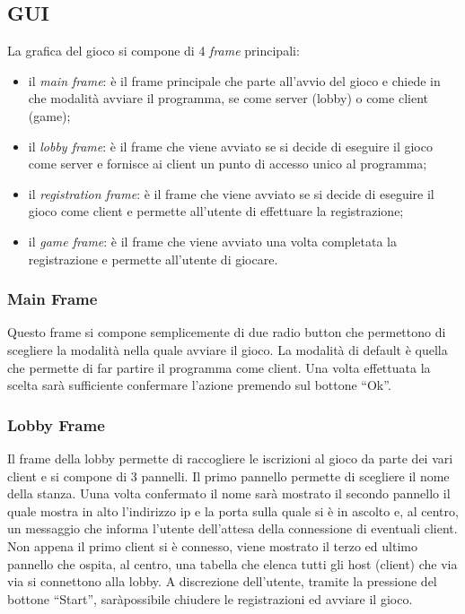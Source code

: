 \subsection{GUI}
La grafica del gioco si compone di 4 \textit{frame} principali:
\begin{itemize}
	\item il \textit{main frame}: è il frame principale che parte all'avvio del
	gioco e chiede in che modalità avviare il programma, se come server (lobby)
	o come client (game);
	\item il \textit{lobby frame}: è il frame che viene avviato se si decide di
	eseguire il gioco come server e fornisce ai client un punto di accesso unico
	al programma;
	\item il \textit{registration frame}: è il frame che viene avviato se si
	decide di eseguire il gioco come client e permette all'utente di effettuare
	la registrazione;
	\item il \textit{game frame}: è il frame che viene avviato una volta
	completata la registrazione e permette all'utente di giocare.
\end{itemize}

\subsubsection{Main Frame}
\label{subsubsection:progettazione_main_frame}
Questo frame si compone semplicemente di due radio button che permettono di
scegliere la modalità nella quale avviare il gioco. La modalità di default è
quella che permette di far partire il programma come client. Una volta
effettuata la scelta sarà sufficiente confermare l'azione premendo sul bottone
``Ok''.

\subsubsection{Lobby Frame}
\label{subsubsection:progettazione_lobby_frame}
Il frame della lobby permette di raccogliere le iscrizioni al gioco da parte dei
vari client e si compone di 3 pannelli.\newline
Il primo pannello permette di scegliere il nome della stanza. Uuna volta
confermato il nome sarà mostrato il secondo pannello il quale mostra in alto
l'indirizzo ip e la porta sulla quale si è in ascolto e, al centro, un messaggio
che informa l'utente dell'attesa della connessione di eventuali client. Non
appena il primo client si è connesso, viene mostrato il terzo ed ultimo pannello
che ospita, al centro, una tabella che elenca tutti gli host (client) che via
via si connettono alla lobby. A discrezione dell'utente, tramite la pressione
del bottone ``Start'', saràpossibile chiudere le registrazioni ed avviare il
gioco.

